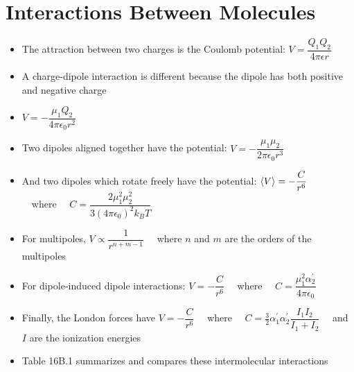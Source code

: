 \documentclass[12pt, openany, letterpaper]{memoir}
\begin{document}
\section{Interactions Between Molecules}
\begin{itemize}
	\item The attraction between two charges is the Coulomb potential: $V=\dfrac{Q_1Q_2}{4\pi\epsilon r}$
	\item A charge-dipole interaction is different because the dipole has both positive and negative charge
	\item $V=-\dfrac{\mu_1Q_2}{4\pi\epsilon_0 r^2}$
	\item Two dipoles aligned together have the potential: $V=-\dfrac{\mu_1\mu_2}{2\pi\epsilon_0r^3}$
	\item And two dipoles which rotate freely have the potential: $\left< V \right>=-\dfrac{C}{r^6}$ ~~where~~ $C=\dfrac{2\mu_1^2\mu_2^2}{3\left(4\pi\epsilon_0\right)^2k_BT}$
	\item For multipoles, $V\propto\dfrac{1}{r^{n+m-1}}$ ~~where $n$ and $m$ are the orders of the multipoles
	\item For dipole-induced dipole interactions: $V = -\dfrac{C}{r^6}$ ~~where~~ $C=\dfrac{\mu_1^2\alpha_2^\prime}{4\pi\epsilon_0}$
	\item Finally, the London forces have $V=-\dfrac{C}{r^6}$ ~~where~~ $C=\frac{3}{2}\alpha_1^\prime\alpha_2^\prime\dfrac{I_1I_2}{I_1+I_2}$ ~~and $I$ are the ionization energies
	\item Table 16B.1 summarizes and compares these intermolecular interactions
\end{itemize}
\end{document}
